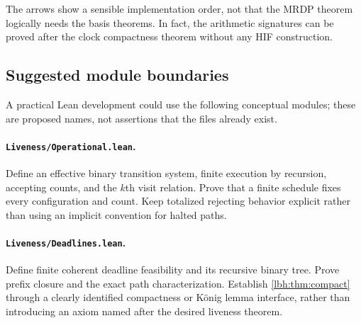 \documentclass[11pt,letterpaper]{article}
\theoremstyle{definition}
\theoremstyle{remark}
\newcommand{\code}[1]{\texttt{#1}}
\newcommand{\1}{\mathbf 1}
\begin{document}
\begin{center}
\end{center}

The arrows show a sensible implementation order, not that the MRDP theorem
logically needs the basis theorems. In fact, the arithmetic signatures can
be proved after the clock compactness theorem without any HIF construction.

\subsection{Suggested module boundaries}
A practical Lean development could use the following conceptual modules;
these are proposed names, not assertions that the files already exist.

\paragraph{\code{Liveness/Operational.lean}.}
Define an effective binary transition system, finite execution by recursion,
accepting counts, and the $k$th visit relation. Prove that a finite schedule
fixes every configuration and count. Keep totalized rejecting behavior
explicit rather than using an implicit convention for halted paths.

\paragraph{\code{Liveness/Deadlines.lean}.}
Define finite coherent deadline feasibility and its recursive binary tree.
Prove prefix closure and the exact path characterization. Establish
\cref{lbh:thm:compact} through a clearly identified compactness or K\"onig
lemma interface, rather than introducing an axiom named after the desired
liveness theorem.
\end{document}
